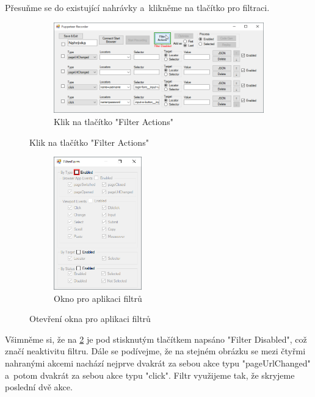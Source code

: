 \documentclass[12pt, a4paper, twoside]{article}
\begin{document}
	Přesuňme se do existující nahrávky a~klikněme na tlačítko pro filtraci.
	\begin{figure}[H]
		\centering
		\begin{subfigure}[t]{1.0\textwidth}
			\centering
			\includegraphics[width=1.0\textwidth]{filterActionsClick.png}
			\caption{Klik na tlačítko "Filter Actions"}
			\label{subfig:editFilterActions}
		\end{subfigure}
	\end{figure}
	\vspace{-0.7cm}
	\begin{figure}[H]\ContinuedFloat
		\centering
		\textdownarrow
	\end{figure}
	\vspace{-0.6cm}
	\begin{figure}[H]\ContinuedFloat
		\centering
		\begin{subfigure}[t]{1.0\textwidth}
			\centering
			\includegraphics[width=0.42\textwidth]{filterFormJustRun.png}
			\caption{Okno pro aplikaci filtrů}
			\label{subfig:filterForm}
		\end{subfigure}
		\caption{Otevření okna pro aplikaci filtrů}
	\end{figure}
	Všimněme si, že na \cref{subfig:editFilterActions} je pod stisknutým tlačítkem napsáno "Filter Disabled", což značí neaktivitu filtru. Dále se podívejme, že na stejném obrázku se mezi čtyřmi nahranými akcemi nachází nejprve dvakrát za sebou akce typu "pageUrlChanged" a~potom dvakrát za sebou akce typu "click". Filtr využijeme tak, že skryjeme poslední dvě akce.
	
\end{document}
